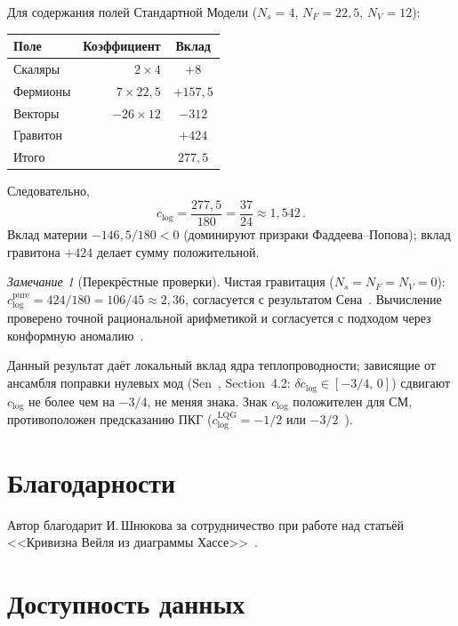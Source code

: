 \documentclass[12pt,a4paper]{article}
\theoremstyle{plain}
\theoremstyle{definition}
\theoremstyle{remark}
\newtheorem{remark}[theorem]{Замечание}
\begin{document}
{{{{{{Для содержания полей Стандартной Модели ($N_s = 4$,
$N_F = 22{,}5$, $N_V = 12$):
\begin{center}
\begin{tabular}{lrc}
\toprule
Поле & Коэффициент & Вклад \\
\midrule
Скаляры  & $2 \times 4$ & $+8$ \\
Фермионы & $7 \times 22{,}5$ & $+157{,}5$ \\
Векторы  & $-26 \times 12$ & $-312$ \\
Гравитон & & $+424$ \\
\midrule
Итого    & & $277{,}5$ \\
\bottomrule
\end{tabular}
\end{center}
Следовательно,
\begin{equation}\label{eq:clog-result}
  \boxed{c_{\log} = \frac{277{,}5}{180}
  = \frac{37}{24} \approx 1{,}542\,.}
\end{equation}
Вклад материи $-146{,}5/180 < 0$ (доминируют призраки
Фаддеева--Попова); вклад гравитона $+424$ делает сумму
положительной.

\begin{remark}[Перекрёстные проверки]
Чистая гравитация ($N_s = N_F = N_V = 0$):
$c_{\log}^{\mathrm{pure}} = 424/180 = 106/45 \approx 2{,}36$,
согласуется с результатом Сена~\cite{Sen:2012}.
Вычисление проверено точной рациональной арифметикой и согласуется
с подходом через конформную аномалию~\cite{BirDav:1982}.

Данный результат даёт локальный вклад ядра теплопроводности;
зависящие от ансамбля поправки нулевых мод
(Sen~\cite{Sen:2012}, Section~4.2: $\delta c_{\log} \in [-3/4,\, 0]$)
сдвигают $c_{\log}$ не более чем на $-3/4$, не меняя знака. Знак $c_{\log}$
положителен для СМ, противоположен предсказанию ПКГ
($c_{\log}^{\mathrm{LQG}} = -1/2$
или $-3/2$~\cite{Meissner:2004,KaulMajumdar:2000}).
\end{remark}

\section*{Благодарности}

Автор благодарит И.\,Шнюкова за сотрудничество при работе над
статьёй <<Кривизна Вейля из диаграммы
Хассе>>~\cite{Alfyorov:2026paper7}.

\section*{Доступность данных}

}}}}}}
\end{document}
